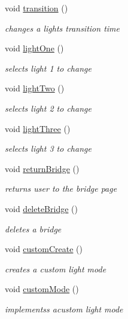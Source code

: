 \begin{DoxyCompactItemize}
void \hyperlink{classLightsControlWidget_a10fad17f0722f34402a906c77c1711bb}{transition} ()
\begin{DoxyCompactList}\small\item\em changes a light\textquotesingle{}s transition time \end{DoxyCompactList}\item 
void \hyperlink{classLightsControlWidget_aedb19ca01377b31ba326bd0e0f82138d}{light\+One} ()
\begin{DoxyCompactList}\small\item\em selects light 1 to change \end{DoxyCompactList}\item 
void \hyperlink{classLightsControlWidget_a8606dd33428f5c5cd7a1e686053b296d}{light\+Two} ()
\begin{DoxyCompactList}\small\item\em selects light 2 to change \end{DoxyCompactList}\item 
void \hyperlink{classLightsControlWidget_a670eae4637f1cc78febb3a751e4272dc}{light\+Three} ()
\begin{DoxyCompactList}\small\item\em selects light 3 to change \end{DoxyCompactList}\item 
void \hyperlink{classLightsControlWidget_a4b17ac832e826eb5665a8f69fe73c5f4}{return\+Bridge} ()
\begin{DoxyCompactList}\small\item\em returns user to the bridge page \end{DoxyCompactList}\item 
void \hyperlink{classLightsControlWidget_aa34bd45ed4b9e07481634641bfa49736}{delete\+Bridge} ()
\begin{DoxyCompactList}\small\item\em deletes a bridge \end{DoxyCompactList}\item 
void \hyperlink{classLightsControlWidget_a0c39f8d5f113562f95cd80b1074ecc57}{custom\+Create} ()
\begin{DoxyCompactList}\small\item\em creates a custom light mode \end{DoxyCompactList}\item 
void \hyperlink{classLightsControlWidget_abb67e6addbaed2126b6afb21e9a262d2}{custom\+Mode} ()
\begin{DoxyCompactList}\small\item\em implementss acustom light mode \end{DoxyCompactList}\item 

\end{DoxyCompactItemize}
